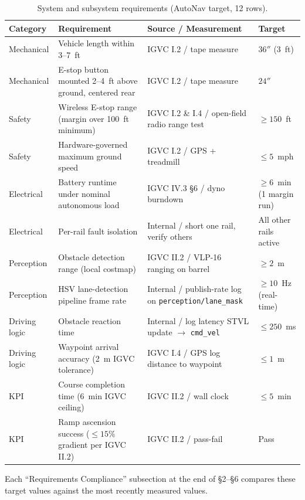 \documentclass[12pt, letterpaper]{article}
\begin{document}
\begin{table}[H]
    \centering
    \scriptsize
    \caption{System and subsystem requirements (AutoNav target, 12 rows).}
    \label{tab:requirements}
    \begin{tabularx}{\textwidth}{l l X l}
        \toprule
        \textbf{Category} & \textbf{Requirement} & \textbf{Source / Measurement} & \textbf{Target} \\
        \midrule
        Mechanical    & Vehicle length within 3--7~ft & IGVC I.2 / tape measure & $36''$ (3~ft) \\
        Mechanical    & E-stop button mounted 2--4~ft above ground, centered rear & IGVC I.2 / tape measure & $24''$ \\
        Safety        & Wireless E-stop range (margin over 100~ft minimum) & IGVC I.2 \& I.4 / open-field radio range test & $\geq 150$~ft \\
        Safety        & Hardware-governed maximum ground speed & IGVC I.2 / GPS + treadmill & $\leq 5$~mph \\
        Electrical    & Battery runtime under nominal autonomous load & IGVC IV.3 \S6 / dyno burndown & $\geq 6$~min (1 margin run) \\
        Electrical    & Per-rail fault isolation & Internal / short one rail, verify others & All other rails active \\
        Perception    & Obstacle detection range (local costmap)  & IGVC II.2 / VLP-16 ranging on barrel & $\geq 2$~m \\
        Perception    & HSV lane-detection pipeline frame rate & Internal / publish-rate log on \texttt{perception/lane\_mask} & $\geq 10$~Hz (real-time) \\
        Driving logic & Obstacle reaction time & Internal / log latency STVL update $\to$ \texttt{cmd\_vel} & $\leq 250$~ms \\
        Driving logic & Waypoint arrival accuracy (2~m IGVC tolerance) & IGVC I.4 / GPS log distance to waypoint & $\leq 1$~m \\
        KPI           & Course completion time (6~min IGVC ceiling) & IGVC II.2 / wall clock & $\leq 5$~min \\
        KPI           & Ramp ascension success ($\leq 15\%$ gradient per IGVC II.2) & IGVC II.2 / pass-fail & Pass \\
        \bottomrule
    \end{tabularx}
\end{table}

Each ``Requirements Compliance'' subsection at the end of \S2--\S6 compares these target
values against the most recently measured values.
\end{document}
